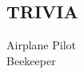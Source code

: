 \documentclass[margin,4pt]{res} %
\begin{document}
\begin{resume}
\section{TRIVIA}  
	Airplane Pilot\\
	Beekeeper\\


\end{resume}
\end{document}
